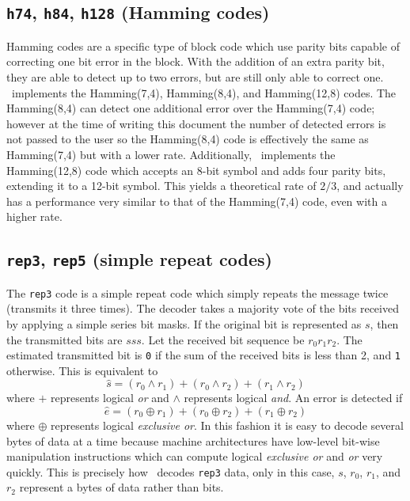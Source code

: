 \subsection{{\tt h74}, {\tt h84}, {\tt h128} (Hamming codes)}
\label{module:fec:hamming}
Hamming codes are a specific type of block
code which use parity bits capable of correcting one bit error in the block.
With the addition of an extra parity bit, they are able to detect up to two
errors, but are still only able to correct one.
\liquid\ implements the Hamming(7,4), Hamming(8,4), and Hamming(12,8)
codes.
The Hamming(8,4) can detect one additional error over the Hamming(7,4)
code;
however at the time of writing this document the number of detected
errors is not passed to the user so the Hamming(8,4) code is effectively
the same as Hamming(7,4) but with a lower rate.
%
Additionally, \liquid\ implements the Hamming(12,8) code which accepts an
8-bit symbol and adds four parity bits, extending it to a 12-bit symbol.
This yields a theoretical rate of $2/3$, and actually has a performance very
similar to that of the Hamming(7,4) code, even with a higher rate.

\subsection{{\tt rep3}, {\tt rep5} (simple repeat codes)}
\label{module:fec:rep}
The {\tt rep3} code is a simple repeat code which simply repeats the message
twice (transmits it three times).
The decoder takes a majority vote of the bits received by applying a simple
series bit masks.
If the original bit is represented as $s$, then the transmitted bits are
$s s s$.
Let the received bit sequence be $r_0 r_1 r_2$.
The estimated transmitted bit is {\tt 0} if the sum of the received bits is
less than 2, and {\tt 1} otherwise.
This is equivalent to
\[
    \hat{s} =   (r_0 \land r_1) + 
                (r_0 \land r_2) + 
                (r_1 \land r_2) 
\]
where $+$ represents logical {\it or} and $\land$ represents
logical {\it and}.
An error is detected if
\[
    \hat{e} =   (r_0 \oplus r_1) + 
                (r_0 \oplus r_2) + 
                (r_1 \oplus r_2) 
\]
where $\oplus$ represents logical {\it exclusive or}.
In this fashion it is easy to decode several bytes of data at a time because
machine architectures have low-level bit-wise manipulation instructions which
can compute logical {\it exclusive or} and {\it or} very quickly.
This is precisely how \liquid\ decodes {\tt rep3} data, only in this case,
$s$, $r_0$, $r_1$, and $r_2$ represent a bytes of data rather than bits.

